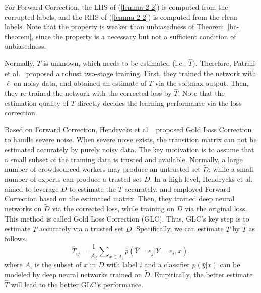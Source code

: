 \begin{remark}
For Forward Correction, the LHS of (\ref{lemma-2-2}) is computed from the corrupted labels, and the RHS of (\ref{lemma-2-2}) is computed from the clean labels. Note that the property is weaker 
than unbiasedness of Theorem~\ref{bc-theorem}, since the property is a necessary but not a sufficient condition of unbiasedness.
\end{remark}
Normally, $T$ is unknown, which needs to be estimated (i.e., $\widehat{T}$). Therefore, Patrini et al.~ proposed a robust two-stage training. First, they trained the network with $\ell$ on noisy data, and obtained an estimate of $T$ via the softmax output. Then, they re-trained the network with the corrected loss by $\widehat{T}$. Note that the estimation quality of $T$ directly decides the learning performance via the loss correction.

Based on Forward Correction, 
Hendrycks et al.~ proposed Gold Loss Correction to handle severe noise. When severe noise exists, the transition matrix can not be estimated accurately by purely noisy data. 
The key motivation is to assume that a small subset of the training data is trusted and available.
Normally, a large number of crowdsourced workers may produce an untrusted set $\widetilde{D}$; 
while a small number of experts can produce a trusted set $D$. In a high-level, Hendrycks et al.~ aimed to leverage $D$ to estimate the $T$ accurately, 
and employed Forward Correction based on the estimated matrix. Then, they trained deep neural networks on $\widetilde{D}$ via the corrected loss, 
while training on $D$ via the original loss. 
This method is called Gold Loss Correction (GLC).
Thus, 
GLC's key step is to estimate $T$ accurately via a trusted set $D$. 
Specifically, 
we can estimate $T$ by $\widehat{T}$ as follows.
\begin{equation*}
\widehat{T}_{ij} 
= \frac{1}{A_i}\sum\nolimits_{x \in A_i}\widehat{p}(\bar{Y} = e_j|Y = e_i,x),
\end{equation*}
where $A_i$ is the subset of $x$ in $D$ with label $i$ and a classifier $\widehat{p}(\bar{y}|x)$ can be modeled by deep neural networks trained on $\widetilde{D}$. Empirically, the better estimate $\widehat{T}$ will lead to the better GLC's performance.

